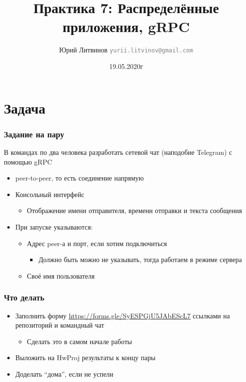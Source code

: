 \documentclass[xetex,mathserif,serif]{beamer}
\title{Практика 7: Распределённые приложения, gRPC}
\author[Юрий Литвинов]{Юрий Литвинов \newline \textcolor{gray}{\small\texttt{yurii.litvinov@gmail.com}}}
\date{19.05.2020г}
\begin{document}
    
    \frame{\titlepage}

    \section{Задача}

    \begin{frame}
        \frametitle{Задание на пару}
        В командах по два человека разработать сетевой чат (наподобие Telegram) с помощью gRPC
        \begin{itemize}
            \item peer-to-peer, то есть соединение напрямую
            \item Консольный интерфейс
            \begin{itemize}
                \item Отображение имени отправителя, времени отправки и текста сообщения
            \end{itemize}
            \item При запуске указываются:
            \begin{itemize}
                \item Адрес peer-а и порт, если хотим подключиться
                \begin{itemize}
                    \item Должно быть можно не указывать, тогда работаем в режиме сервера
                \end{itemize}
                \item Своё имя пользователя
            \end{itemize}
        \end{itemize}
    \end{frame}

    \begin{frame}
        \frametitle{Что делать}
        \begin{itemize}
            \item Заполнить форму \url{https://forms.gle/SyESPGjU5JAbEScL7} ссылками на репозиторий и командный чат
            \begin{itemize}
                \item Сделать это в самом начале работы
            \end{itemize}
            \item Выложить на HwProj результаты к концу пары
            \item Доделать ``дома'', если не успели
        \end{itemize}
    \end{frame}
\end{document}
